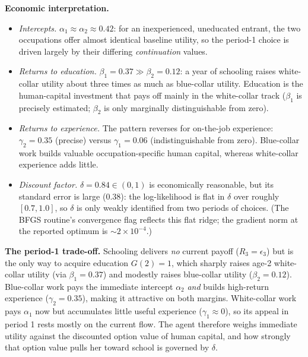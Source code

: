 \documentclass[11pt,english]{article}
\begin{document}
\textbf{Economic interpretation.}
\begin{itemize}[nosep]
\item \emph{Intercepts.} $\alpha_1\approx\alpha_2\approx0.42$: for an
inexperienced, uneducated entrant, the two occupations offer almost identical
baseline utility, so the period-1 choice is driven largely by their differing
\emph{continuation} values.
\item \emph{Returns to education.} $\beta_1=0.37\gg\beta_2=0.12$: a year of
schooling raises white-collar utility about three times as much as blue-collar
utility. Education is the human-capital investment that pays off mainly in the
white-collar track ($\beta_1$ is precisely estimated; $\beta_2$ is only
marginally distinguishable from zero).
\item \emph{Returns to experience.} The pattern reverses for on-the-job
experience: $\gamma_2=0.35$ (precise) versus $\gamma_1=0.06$ (indistinguishable
from zero). Blue-collar work builds valuable occupation-specific human capital,
whereas white-collar experience adds little.
\item \emph{Discount factor.} $\hat\delta=0.84\in(0,1)$ is economically
reasonable, but its standard error is large ($0.38$): the log-likelihood is flat
in $\delta$ over roughly $[0.7,1.0]$, so $\delta$ is only weakly identified from
two periods of choices. (The BFGS routine's convergence flag reflects this flat
ridge; the gradient norm at the reported optimum is $\sim\!2\times10^{-4}$.)
\end{itemize}

\textbf{The period-1 trade-off.} Schooling delivers \emph{no} current payoff
($R_3=\epsilon_3$) but is the only way to acquire education $G(2)=1$, which
sharply raises age-2 white-collar utility (via $\beta_1=0.37$) and modestly
raises blue-collar utility ($\beta_2=0.12$). Blue-collar work pays the immediate
intercept $\alpha_2$ \emph{and} builds high-return experience ($\gamma_2=0.35$),
making it attractive on both margins. White-collar work pays $\alpha_1$ now but
accumulates little useful experience ($\gamma_1\approx0$), so its appeal in
period 1 rests mostly on the current flow. The agent therefore weighs immediate
utility against the discounted option value of human capital, and how strongly
that option value pulls her toward school is governed by $\delta$.
\end{document}
